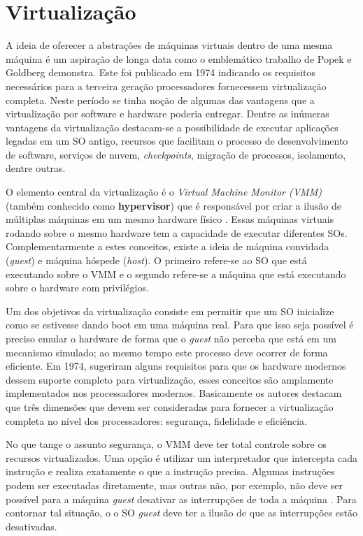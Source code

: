 \section{Virtualização}
\label{sec:virtualizacao}


A ideia de oferecer a abstrações de máquinas virtuais dentro de uma mesma
máquina é um aspiração de longa data como o emblemático trabalho de Popek e
Goldberg \cite{popek} demonstra. Este foi publicado em 1974 indicando os
requisitos necessários para a terceira geração processadores fornecessem
virtualização completa. Neste período se tinha noção de algumas das vantagens
que a virtualização por software e hardware poderia entregar. Dentre as
inúmeras vantagens da virtualização destacam-se a possibilidade de executar
aplicações legadas em um SO antigo, recursos que facilitam o processo de
desenvolvimento de software, serviços de nuvem, \emph{checkpoints}, migração de
processos, isolamento, dentre outras.

O elemento central da virtualização é o \emph{Virtual Machine Monitor (VMM)}
(também conhecido como \textbf{hypervisor}) que é responsável por criar a
ilusão de múltiplas máquinas em um mesmo hardware físico \cite{tanenbaum}.
Essas máquinas virtuais rodando sobre o mesmo hardware tem a capacidade de
executar diferentes SOs. Complementarmente a estes conceitos, existe a ideia de
máquina convidada (\emph{guest}) e máquina hóspede (\emph{host}). O primeiro
refere-se ao SO que está executando sobre o VMM e o segundo refere-se a máquina
que está executando sobre o hardware com privilégios.

Um dos objetivos da virtualização consiste em permitir que um SO inicialize
como se estivesse dando boot em uma máquina real. Para que isso seja possível é
preciso emular o hardware de forma que o \emph{guest} não perceba que está em
um mecanismo simulado; ao mesmo tempo este processo deve ocorrer de forma
eficiente. Em 1974, \citep{popek} sugeriram alguns requisitos para que os
hardware modernos dessem suporte completo para virtualização, esses conceitos
são amplamente implementados nos processadores modernos. Basicamente os autores
destacam que três dimensões que devem ser consideradas para fornecer a
virtualização completa no nível dos processadores: segurança, fidelidade e
eficiência.

No que tange o assunto segurança, o VMM deve ter total controle sobre os
recursos virtualizados. Uma opção é utilizar um interpretador que intercepta
cada instrução e realiza exatamente o que a instrução precisa. Algumas
instruções podem ser executadas diretamente, mas outras não, por exemplo, não
deve ser possível para a máquina \emph{guest} desativar as interrupções de toda
a máquina \cite{tanenbaum}. Para contornar tal situação, o o SO \emph{guest}
deve ter a ilusão de que as interrupções estão desativadas.

